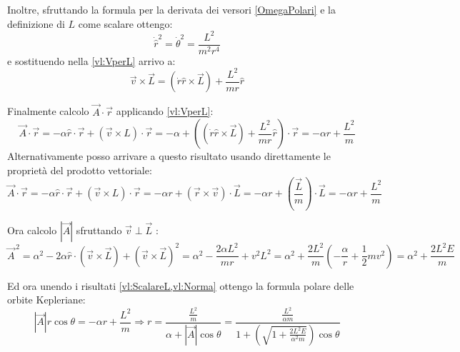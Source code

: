 \documentclass[../main.tex]{subfiles}
\begin{document}
Inoltre, sfruttando la formula per la derivata dei versori \cref{OmegaPolari} e la definizione di $L$ come scalare ottengo:
\begin{equation*}
	\dot{\hat r}^2=\dot{\theta}^2=\frac{L^2}{m^2r^4}
\end{equation*}
e sostituendo nella \cref{vl:VperL} arrivo a:
\begin{equation}\label{vl:fineConto}
	\vec v\times \vec L=(\dot r \hat r \times \vec L)+\frac{L^2}{mr}\hat r
\end{equation}

Finalmente calcolo $\vec A\cdot \vec r$ applicando \cref{vl:VperL}:
\begin{equation}\label{vl:ScalareL}
	\vec A\cdot \vec r=-\alpha\hat r\cdot \vec r+(\vec v\times L)\cdot \vec r=
	-\alpha+\left((\dot r \hat r \times \vec L)+\frac{L^2}{mr}\hat r\right)\cdot \vec r=
	-\alpha r+\frac{L^2}{m}
\end{equation}
Alternativamente posso arrivare a questo risultato usando direttamente le proprietà del prodotto vettoriale:
\begin{equation*}
	\vec A\cdot \vec r=-\alpha\hat r\cdot \vec r+(\vec v\times L)\cdot \vec r=
	-\alpha r+(\vec r\times \vec v)\cdot \vec L=-\alpha r + \left(\frac{\vec L}{m}\right)\cdot \vec L=
	-\alpha r+\frac{L^2}m
\end{equation*}

Ora calcolo $|\vec A|$ sfruttando $\vec v\perp \vec L$ :
\begin{equation}\label{vl:Norma}
	\vec{A} ^{\,2}=\alpha^2-2\alpha\hat r\cdot\left(\vec v\times \vec L\right)+(\vec v\times \vec L)^2=
	\alpha^2-\frac{2\alpha L^2}{mr}+v^2L^2=\alpha^2+\frac{2L^2}m\left(-\frac{\alpha}{r}+\frac12mv^2\right)=\alpha^2+\frac{2L^2E}m
\end{equation}

Ed ora unendo i risultati \cref{vl:ScalareL,vl:Norma} ottengo la formula polare delle orbite Kepleriane:
\begin{equation}\label{vl:OrbiteKepleriane}
	|\vec A|r\cos \theta=-\alpha r+\frac{L^2}m\Rightarrow r=\frac{\frac{L^2}m}{\alpha +|\vec A|\cos \theta}=
	\frac{\frac{L^2}{\alpha m}}{1+\left(\sqrt{1+\frac{2L^2E}{\alpha^2m}}\right)\cos \theta}
\end{equation}
\end{document}
